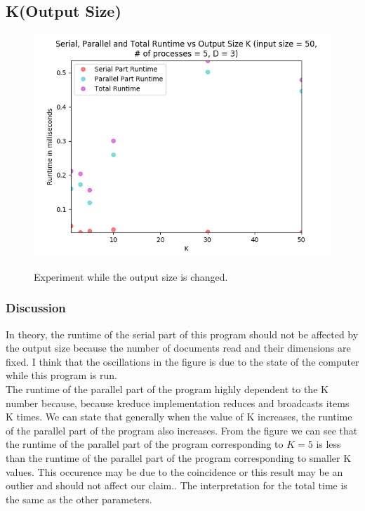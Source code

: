 \documentclass{article}
\begin{document}
\subsection{K(Output Size)}

\begin{figure}[H]
\centering
\includegraphics[width=\linewidth]{assets/input_size_50_numproc_5_D_3.png}
\label{fig:test1}
\vspace{-2pt}
\caption{Experiment while the output size is changed.}
\end{figure}

\subsubsection{Discussion}
\qquad In theory, the runtime of the serial part of this program should not be affected by the output size because the number of documents read and their dimensions are fixed. I think that the oscillations in the figure is due to the state of the computer while this program is run. \\
\null \qquad The runtime of the parallel part of the program highly dependent to the K number because, because kreduce implementation reduces and broadcasts items K times. We can state that generally when the value of K increases, the runtime of the parallel part of the program also increases. From the figure we can see that the runtime of the parallel part of the program corresponding to $K = 5$ is less than the runtime of the parallel part of the program corresponding to smaller K values. This occurence may be due to the coincidence or this result may be an outlier and should not affect our claim.. The interpretation for the total time is the same as the other parameters.
\end{document}
